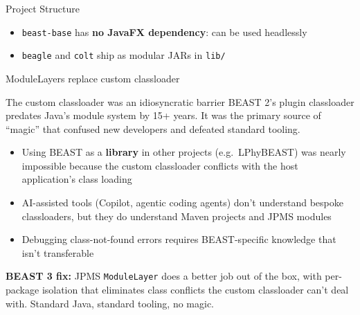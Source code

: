 \documentclass[aspectratio=169,11pt]{beamer}
\newcommand{\code}[1]{\texttt{#1}}
\begin{document}
\begin{frame}{Project Structure}
\begin{center}
\end{center}
\vspace{1em}
\begin{itemize}
\item \code{beast-base} has \textbf{no JavaFX dependency}: can be used headlessly
\item \code{beagle} and \code{colt} ship as modular JARs in \code{lib/}
\end{itemize}
\end{frame}

\begin{frame}{ModuleLayers replace custom classloader}
\begin{alertblock}{The custom classloader was an idiosyncratic barrier}
BEAST 2's plugin classloader predates Java's module system by 15+ years. It was the primary source of ``magic'' that confused new developers and defeated standard tooling.
\end{alertblock}

\vspace{0.5em}
\begin{itemize}
\item Using BEAST as a \textbf{library} in other projects (e.g.\ LPhyBEAST) was nearly impossible because the custom classloader conflicts with the host application's class loading
\item AI-assisted tools (Copilot, agentic coding agents) don't understand bespoke classloaders, but they do understand Maven projects and JPMS modules
\item Debugging class-not-found errors requires BEAST-specific knowledge that isn't transferable
\end{itemize}

\vspace{0.5em}
\textbf{BEAST 3 fix:} JPMS \code{ModuleLayer} does a better job out of the box, with per-package isolation that eliminates class conflicts the custom classloader can't deal with. Standard Java, standard tooling, no magic.
\end{frame}
\end{document}
